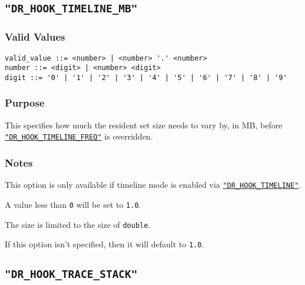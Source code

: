 \subsection{\texttt{"DR\_HOOK\_TIMELINE\_MB"}}
\label{section:flags:DR_HOOK_TIMELINE_MB}
\vspace{-2ex}
\subsubsection{Valid Values}
\vspace{-2ex}
\verb+valid_value ::= <number> | <number> '.' <number> + \\
\verb+number ::= <digit> | <number> <digit>+ \\
\verb+digit ::= '0' | '1' | '2' | '3' | '4' | '5' | '6' | '7' | '8' | '9'+

\vspace{-2ex}
\subsubsection{Purpose}
\vspace{-2ex}
This specifies how much the resident set size needs to vary by, in MB, before \hyperref[section:flags:DR_HOOK_TIMELINE_FREQ]{\texttt{"DR\_HOOK\_TIMELINE\_FREQ"}} is overridden.

\vspace{-2ex}
\subsubsection{Notes}
\vspace{-2ex}
This option is only available if timeline mode is enabled via \hyperref[section:flags:DR_HOOK_TIMELINE]{\texttt{"DR\_HOOK\_TIMELINE"}}.

A value less than \verb|0| will be set to \verb|1.0|.

The size is limited to the size of \verb|double|.

If this option isn't specified, then it will default to \verb|1.0|.



\subsection{\texttt{"DR\_HOOK\_TRACE\_STACK"}}
\label{section:flags:DR_HOOK_TRACE_STACK}
\vspace{-2ex}

